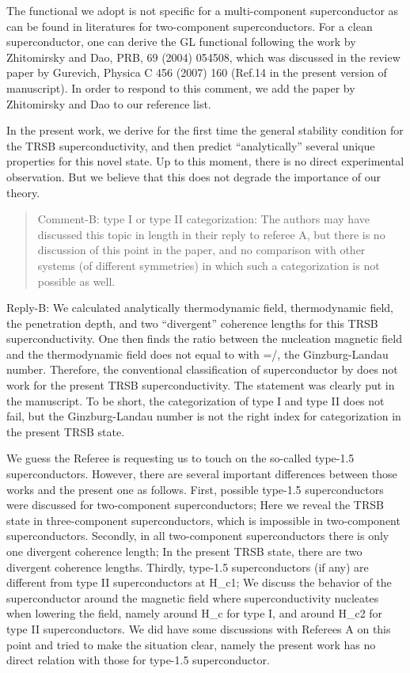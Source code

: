 \documentclass[11pt]{article}
\begin{document}
The functional we adopt is not specific for a multi-component
superconductor as can be found in literatures for two-component
superconductors. For a clean superconductor, one can derive the GL
functional following the work by Zhitomirsky and Dao, PRB, 69 (2004)
054508, which was discussed in the review paper by Gurevich, Physica C
456 (2007) 160 (Ref.14 in the present version of manuscript). In order
to respond to this comment, we add the paper by Zhitomirsky and Dao to
our reference list.

In the present work, we derive for the first time the general stability
condition for the TRSB superconductivity, and then predict
``analytically'' several unique properties for this novel state. Up to
this moment, there is no direct experimental observation. But we believe
that this does not degrade the importance of our theory.

\begin{quote}
Comment-B: type I or type II categorization: The authors may have
discussed this topic in length in their reply to referee A, but there is
no discussion of this point in the paper, and no comparison with other
systems (of different symmetries) in which such a categorization is not
possible as well.
\end{quote}

Reply-B: We calculated analytically thermodynamic field, thermodynamic
field, the penetration depth, and two ``divergent'' coherence lengths
for this TRSB superconductivity. One then finds the ratio between the
nucleation magnetic field and the thermodynamic field does not equal to
\kappa with \kappa=\lambda/\xi, the Ginzburg-Landau number.
Therefore, the conventional classification of superconductor by
\kappa does not work for the present TRSB superconductivity. The
statement was clearly put in the manuscript. To be short, the
categorization of type I and type II does not fail, but the
Ginzburg-Landau number is not the right index for categorization in the
present TRSB state.

We guess the Referee is requesting us to touch on the so-called type-1.5
superconductors. However, there are several important differences
between those works and the present one as follows. First, possible
type-1.5 superconductors were discussed for two-component
superconductors; Here we reveal the TRSB state in three-component
superconductors, which is impossible in two-component superconductors.
Secondly, in all two-component superconductors there is only one
divergent coherence length; In the present TRSB state, there are two
divergent coherence lengths. Thirdly, type-1.5 superconductors (if any)
are different from type II superconductors at H\_c1; We discuss the
behavior of the superconductor around the magnetic field where
superconductivity nucleates when lowering the field, namely around H\_c
for type I, and around H\_c2 for type II superconductors. We did have
some discussions with Referees A on this point and tried to make the
situation clear, namely the present work has no direct relation with
those for type-1.5 superconductor.
\end{document}
